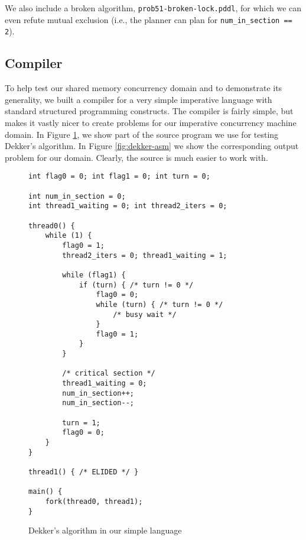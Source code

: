 We also include a broken algorithm, \texttt{prob51-broken-lock.pddl}, for which we can even refute mutual exclusion (i.e., the planner can plan for \texttt{num\_in\_section == 2}).

\subsection{Compiler}

To help test our shared memory concurrency domain and to demonstrate
its generality, we built a compiler for a very simple imperative
language with standard structured programming constructs. The compiler
is fairly simple, but makes it vastly nicer to create problems for our
imperative concurrency machine domain. In Figure
\ref{fig:dekker-code}, we show part of the source program we use for
testing Dekker's algorithm. In Figure \ref{fig:dekker-asm} we show the
corresponding output problem for our domain. Clearly, the source is
much easier to work with.



\begin{figure}
\begin{center}
\begin{verbatim}
int flag0 = 0; int flag1 = 0; int turn = 0;

int num_in_section = 0;
int thread1_waiting = 0; int thread2_iters = 0;

thread0() {
    while (1) {
        flag0 = 1;
        thread2_iters = 0; thread1_waiting = 1;

        while (flag1) {
            if (turn) { /* turn != 0 */
                flag0 = 0;
                while (turn) { /* turn != 0 */
                    /* busy wait */
                }
                flag0 = 1;
            }
        }

        /* critical section */
        thread1_waiting = 0;
        num_in_section++;
        num_in_section--;

        turn = 1;
        flag0 = 0;
    }
}

thread1() { /* ELIDED */ }

main() {
    fork(thread0, thread1);
}
\end{verbatim}
\end{center}
\caption{Dekker's algorithm in our simple language}
\label{fig:dekker-code}
\end{figure}

